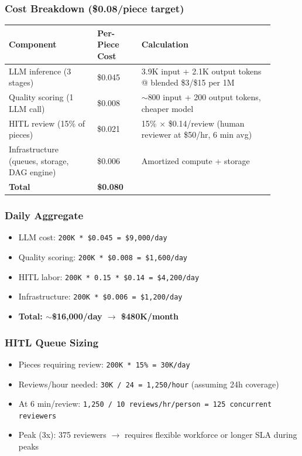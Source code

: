 \subsubsection*{Cost Breakdown (\$0.08/piece target)}

\begin{tabular}{|p{0.30\linewidth}|p{0.15\linewidth}|p{0.45\linewidth}|}
\hline
\textbf{Component} & \textbf{Per-Piece Cost} & \textbf{Calculation} \\
\hline
LLM inference (3 stages) & \$0.045 & 3.9K input + 2.1K output tokens @ blended \$3/\$15 per 1M \\
\hline
Quality scoring (1 LLM call) & \$0.008 & $\sim$800 input + 200 output tokens, cheaper model \\
\hline
HITL review (15\% of pieces) & \$0.021 & 15\% $\times$ \$0.14/review (human reviewer at \$50/hr, 6 min avg) \\
\hline
Infrastructure (queues, storage, DAG engine) & \$0.006 & Amortized compute + storage \\
\hline
\textbf{Total} & \textbf{\$0.080} & \\
\hline
\end{tabular}

\subsubsection*{Daily Aggregate}

\begin{itemize}
  \item LLM cost: \texttt{200K * \$0.045 = \$9,000/day}
  \item Quality scoring: \texttt{200K * \$0.008 = \$1,600/day}
  \item HITL labor: \texttt{200K * 0.15 * \$0.14 = \$4,200/day}
  \item Infrastructure: \texttt{200K * \$0.006 = \$1,200/day}
  \item \textbf{Total: $\sim$\$16,000/day $\rightarrow$ \$480K/month}
\end{itemize}

\subsubsection*{HITL Queue Sizing}

\begin{itemize}
  \item Pieces requiring review: \texttt{200K * 15\% = 30K/day}
  \item Reviews/hour needed: \texttt{30K / 24 = 1,250/hour} (assuming 24h coverage)
  \item At 6 min/review: \texttt{1,250 / 10 reviews/hr/person = 125 concurrent reviewers}
  \item Peak (3x): 375 reviewers $\rightarrow$ requires flexible workforce or longer SLA during peaks
\end{itemize}

